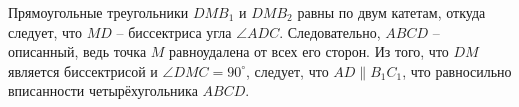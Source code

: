 \documentclass[14pt]{extarticle}
\theoremstyle{definition}
\theoremstyle{theorem}
\begin{document}
Прямоугольные треугольники 
\(DMB_1\) и \(DMB_2\) равны по двум катетам, откуда 
следует, что \(MD\) -- биссектриса угла 
\(\angle ADC\). Следовательно, \(ABCD\) -- описанный, 
ведь точка \(M\) равноудалена от всех его сторон. 
Из того, что \(DM\) является биссектрисой и 
\(\angle DMC = 90^{\circ}\), следует, что 
\(AD \parallel B_1C_1\), что равносильно вписанности 
четырёхугольника \(ABCD\).



 
\end{document}
